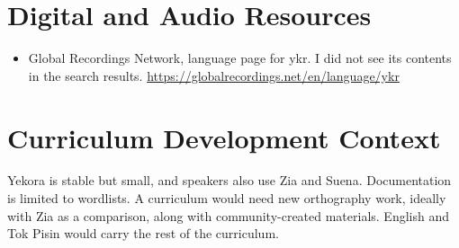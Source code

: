 \documentclass[12pt]{article}
\begin{document}
\section{Digital and Audio Resources}
\begin{itemize}
\item Global Recordings Network, language page for ykr. I did not see its contents in the search results. \url{https://globalrecordings.net/en/language/ykr}
\end{itemize}

\section{Curriculum Development Context}
Yekora is stable but small, and speakers also use Zia and Suena. Documentation is limited to wordlists. A curriculum would need new orthography work, ideally with Zia as a comparison, along with community-created materials. English and Tok Pisin would carry the rest of the curriculum.
\end{document}
